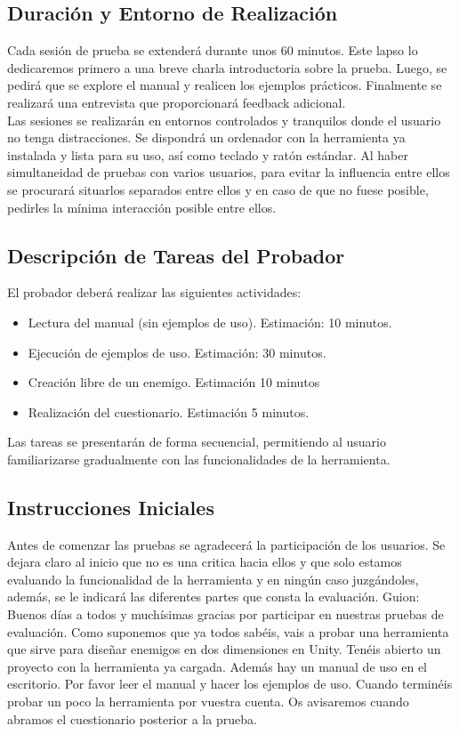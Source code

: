 \subsection{Duración y Entorno de Realización}
Cada sesión de prueba se extenderá durante unos 60 minutos. Este lapso lo dedicaremos primero a una breve charla introductoria sobre la prueba. Luego, se pedirá que se explore el manual y realicen los ejemplos prácticos. Finalmente se realizará una entrevista que proporcionará feedback adicional.\\

Las sesiones se realizarán en entornos controlados y tranquilos donde el usuario no tenga distracciones. Se dispondrá un ordenador con la herramienta ya instalada y lista para su uso, así como teclado y ratón estándar. Al haber simultaneidad de pruebas con varios usuarios, para evitar la influencia entre ellos se procurará situarlos separados entre ellos y en caso de que no fuese posible, pedirles la mínima interacción posible entre ellos.

\subsection{Descripción de Tareas del Probador}
El probador deberá realizar las siguientes actividades:

\begin{itemize}
\item Lectura del manual (sin ejemplos de uso). Estimación: 10 minutos.
\item Ejecución de ejemplos de uso. Estimación: 30 minutos.
\item Creación libre de un enemigo. Estimación 10 minutos
\item Realización del cuestionario. Estimación 5 minutos.
\end{itemize}

Las tareas se presentarán de forma secuencial, permitiendo al usuario familiarizarse gradualmente con las funcionalidades de la herramienta. 

\subsection{Instrucciones Iniciales}

Antes de comenzar las pruebas se agradecerá la participación de los usuarios. Se dejara claro al inicio que no es una critica hacia ellos y que solo estamos evaluando la funcionalidad de la herramienta y en ningún caso juzgándoles, 
además, se le indicará las diferentes partes que consta la evaluación.
Guion: 
Buenos días a todos y muchísimas gracias por participar en nuestras pruebas de evaluación. 
Como suponemos que ya todos sabéis, vais a probar una herramienta que sirve para diseñar enemigos en dos dimensiones en Unity. 
Tenéis abierto un proyecto con la herramienta ya cargada. Además hay un manual de uso en el escritorio. 
Por favor leer el manual y hacer los ejemplos de uso. Cuando terminéis probar un poco la herramienta por vuestra cuenta. Os avisaremos cuando abramos el cuestionario posterior a la prueba.

